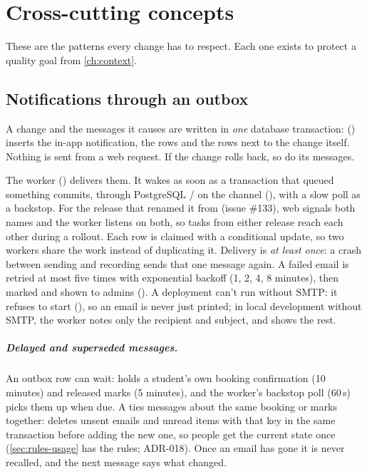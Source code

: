 \chapter{Cross-cutting concepts}\label{ch:crosscutting}

These are the patterns every change has to respect. Each one exists to protect a quality goal
from \cref{ch:context}.

\section{Notifications through an outbox}\label{sec:outbox}
A change and the messages it causes are written in \emph{one} database transaction:
 () inserts the in-app notification, the
 rows and the  rows next to the change itself. Nothing is sent
from a web request. If the change rolls back, so do its messages.

The worker () delivers them. It wakes as soon as a transaction that queued
something commits, through PostgreSQL / on the channel
 (), with a slow poll as a backstop. For the
release that renamed it from  (issue \#133), web signals both names and the
worker listens on both, so tasks from either release reach each other during a rollout. Each row is claimed with a conditional update, so two workers share
the work instead of duplicating it. Delivery is \emph{at least once}: a crash between sending and
recording sends that one message again. A failed email is retried at most five times with
exponential backoff (1, 2, 4, 8 minutes), then marked  and shown to admins
(). A deployment can't run without SMTP: it refuses to start
(), so an email is never just printed; in local development
without SMTP, the worker notes only the recipient and subject, and  shows the
rest.

\paragraph{Delayed and superseded messages.} An outbox row can wait:  holds a
student's own booking confirmation (10 minutes) and released marks (5 minutes), and the worker's
backstop poll (60\,s) picks them up when due. A  ties messages about the same
booking or marks together:  deletes unsent emails and unread items with that key in
the same transaction before adding the new one, so people get the current state once
(\cref{sec:rules-usage} has the rules; ADR-018). Once an email has gone it is never recalled, and
the next message says what changed.

